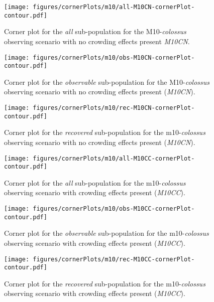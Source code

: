 \documentclass[twocolumn]{aastex63}
\begin{document}
\begin{figure}
    \centering
    \texttt{[image: figures/cornerPlots/m10/all-M10CN-cornerPlot-contour.pdf]}
    \caption{Corner plot for the \textit{all} sub-population for the M10-\textit{colossus} observing scenario with no crowding effects present \textit{M10CN}.}
    \label{fig:all-m10cn-All-corner-plot-appendix}
\end{figure}\clearpage
\begin{figure}
    \centering
    \texttt{[image: figures/cornerPlots/m10/obs-M10CN-cornerPlot-contour.pdf]}
    \caption{Corner plot for the \textit{observable} sub-population for the M10-\textit{colossus} observing scenario with no crowding effects present (\textit{M10CN}).}
    \label{fig:obs-m10cn-Obs-corner-plot-appendix}
\end{figure}\clearpage
\begin{figure}
    \centering
    \texttt{[image: figures/cornerPlots/m10/rec-M10CN-cornerPlot-contour.pdf]}
    \caption{Corner plot for the \textit{recovered} sub-population for the m10-\textit{colossus} observing scenario with no crowding effects present (\textit{M10CN}).}
    \label{fig:rec-m10cn-Rec-corner-plot-appendix}
\end{figure}\clearpage
\begin{figure}
    \centering
    \texttt{[image: figures/cornerPlots/m10/all-M10CC-cornerPlot-contour.pdf]}
    \caption{Corner plot for the \textit{all} sub-population for the m10-\textit{colossus} observing scenario with crowding effects present (\textit{M10CC}).}
    \label{fig:m10cc-All-corner-plot-appendix}
\end{figure}\clearpage
\begin{figure}
    \centering
    \texttt{[image: figures/cornerPlots/m10/obs-M10CC-cornerPlot-contour.pdf]}
    \caption{Corner plot for the \textit{observable} sub-population for the m10-\textit{colossus} observing scenario with crowding effects present (\textit{M10CC}).}
    \label{fig:m10cc-Obs-corner-plot-appendix}
\end{figure}\clearpage
\begin{figure}
    \centering
    \texttt{[image: figures/cornerPlots/m10/rec-M10CC-cornerPlot-contour.pdf]}
    \caption{Corner plot for the \textit{recovered} sub-population for the m10-\textit{colossus} observing scenario with crowding effects present (\textit{M10CC}).}
    \label{fig:m10cc-Rec-corner-plot-appendix}
\end{figure}\clearpage
\end{document}
